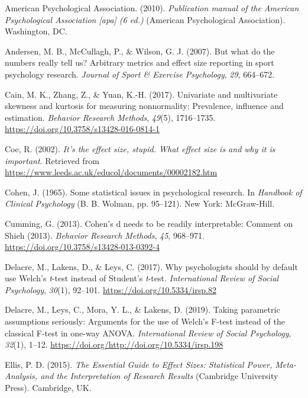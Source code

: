 \documentclass[
  english,
  man,floatsintext]{apa6}
\begin{document}
\leavevmode\hypertarget{ref-APA_2010}{}%
American Psychological Association. (2010). \emph{Publication manual of the American Psychological Association {[}apa{]} (6 ed.)} (American Psychological Association). Washington, DC.

\leavevmode\hypertarget{ref-Andersen_et_al_2007}{}%
Andersen, M. B., McCullagh, P., \& Wilson, G. J. (2007). But what do the numbers really tell us? Arbitrary metrics and effect size reporting in sport psychology research. \emph{Journal of Sport \& Exercise Psychology}, \emph{29}, 664--672.

\leavevmode\hypertarget{ref-Cain_et_al_2017}{}%
Cain, M. K., Zhang, Z., \& Yuan, K.-H. (2017). Univariate and multivariate skewness and kurtosis for measuring nonnormality: Prevalence, influence and estimation. \emph{Behavior Research Methods}, \emph{49}(5), 1716--1735. \url{https://doi.org/10.3758/s13428-016-0814-1}

\leavevmode\hypertarget{ref-Coe_2002}{}%
Coe, R. (2002). \emph{It's the effect size, stupid. What effect size is and why it is important}. Retrieved from \url{https://www.leeds.ac.uk/educol/documents/00002182.htm}

\leavevmode\hypertarget{ref-Cohen_1965}{}%
Cohen, J. (1965). Some statistical issues in psychological research. In \emph{Handbook of Clinical Psychology} (B. B. Wolman, pp. 95--121). New York: McGraw-Hill.

\leavevmode\hypertarget{ref-Cumming_2013}{}%
Cumming, G. (2013). Cohen's d needs to be readily interpretable: Comment on Shieh (2013). \emph{Behavior Research Methods}, \emph{45}, 968--971. \url{https://doi.org/10.3758/s13428-013-0392-4}

\leavevmode\hypertarget{ref-Delacre_et_al_2017}{}%
Delacre, M., Lakens, D., \& Leys, C. (2017). Why psychologists should by default use Welch's \emph{t}-test instead of Student's \emph{t}-test. \emph{International Review of Social Psychology}, \emph{30}(1), 92--101. \url{https://doi.org/10.5334/irsp.82}

\leavevmode\hypertarget{ref-Delacre_et_al_2019}{}%
Delacre, M., Leys, C., Mora, Y. L., \& Lakens, D. (2019). Taking parametric assumptions seriously: Arguments for the use of Welch's F-test instead of the classical F-test in one-way ANOVA. \emph{International Review of Social Psychology}, \emph{32}(1), 1--12. \url{https://doi.org/http://doi.org/10.5334/irsp.198}

\leavevmode\hypertarget{ref-Ellis_2015}{}%
Ellis, P. D. (2015). \emph{The Essential Guide to Effect Sizes: Statistical Power, Meta-Analysis, and the Interpretation of Research Results} (Cambridge University Press). Cambridge, UK.
\end{document}
